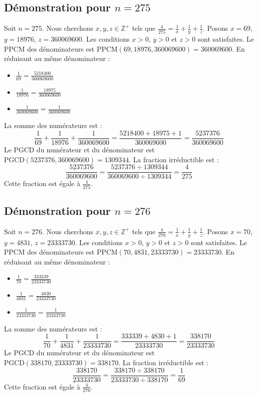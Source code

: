 \documentclass[11pt,a4paper]{article}
\begin{document}
\subsection{Démonstration pour $n = 275$}
Soit $n = 275$. Nous cherchons $x, y, z \in \mathbb{Z}^{+}$ tels que $\frac{4}{275} = \frac{1}{x} + \frac{1}{y} + \frac{1}{z}$.
Posons $x = 69$, $y = 18976$, $z = 360069600$.
Les conditions $x > 0$, $y > 0$ et $z > 0$ sont satisfaites.
Le PPCM des dénominateurs est $\text{PPCM}(69, 18976, 360069600) = 360069600$.
En réduisant au même dénominateur :
\begin{itemize}
    \item $\frac{1}{69} = \frac{5218400}{360069600}$
    \item $\frac{1}{18976} = \frac{18975}{360069600}$
    \item $\frac{1}{360069600} = \frac{1}{360069600}$
\end{itemize}
La somme des numérateurs est :
$$ \frac{1}{69} + \frac{1}{18976} + \frac{1}{360069600} = \frac{5218400 + 18975 + 1}{360069600} = \frac{5237376}{360069600} $$
Le PGCD du numérateur et du dénominateur est $\text{PGCD}(5237376, 360069600) = 1309344$.
La fraction irréductible est :
$$ \frac{5237376}{360069600} = \frac{5237376 \div 1309344}{360069600 \div 1309344} = \frac{4}{275} $$
Cette fraction est égale à $\frac{4}{275}$.

\subsection{Démonstration pour $n = 276$}
Soit $n = 276$. Nous cherchons $x, y, z \in \mathbb{Z}^{+}$ tels que $\frac{4}{276} = \frac{1}{x} + \frac{1}{y} + \frac{1}{z}$.
Posons $x = 70$, $y = 4831$, $z = 23333730$.
Les conditions $x > 0$, $y > 0$ et $z > 0$ sont satisfaites.
Le PPCM des dénominateurs est $\text{PPCM}(70, 4831, 23333730) = 23333730$.
En réduisant au même dénominateur :
\begin{itemize}
    \item $\frac{1}{70} = \frac{333339}{23333730}$
    \item $\frac{1}{4831} = \frac{4830}{23333730}$
    \item $\frac{1}{23333730} = \frac{1}{23333730}$
\end{itemize}
La somme des numérateurs est :
$$ \frac{1}{70} + \frac{1}{4831} + \frac{1}{23333730} = \frac{333339 + 4830 + 1}{23333730} = \frac{338170}{23333730} $$
Le PGCD du numérateur et du dénominateur est $\text{PGCD}(338170, 23333730) = 338170$.
La fraction irréductible est :
$$ \frac{338170}{23333730} = \frac{338170 \div 338170}{23333730 \div 338170} = \frac{1}{69} $$
Cette fraction est égale à $\frac{4}{276}$.
\end{document}
